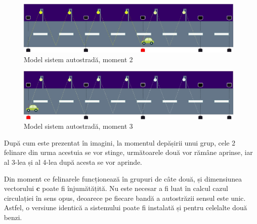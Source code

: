 \begin{figure}[!ht]
    \begin{center}
    \includegraphics[width=\linewidth,keepaspectratio]{pics/hw2.jpg}
    \end{center}
    \caption{Model sistem autostradă, moment 2}
    \label{fig:hw2}
\end{figure}

\begin{figure}[!ht]
    \begin{center}
    \includegraphics[width=\linewidth,keepaspectratio]{pics/hw3.jpg}
    \end{center}
    \caption{Model sistem autostradă, moment 3}
    \label{fig:hw3}
\end{figure}

 După cum este prezentat în imagini, la momentul depășirii unui grup, cele 2 felinare din urma acestuia se vor stinge, următoarele două vor rămâne aprinse, iar al 3-lea și al 4-lea după acesta se vor aprinde. 
 
 Din moment ce felinarele funcționează în grupuri de câte două, și dimensiunea vectorului $\mathbf{c}$ poate fi înjumătățită. 
 Nu este necesar a fi luat în calcul cazul circulației în sens opus, deoarece pe fiecare bandă a autostrăzii sensul este unic. Astfel, o versiune identică a sistemului poate fi instalată și pentru celelalte două benzi.

